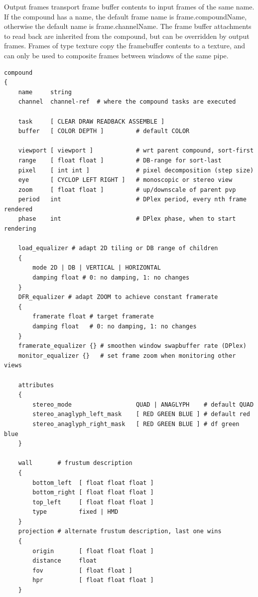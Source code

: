 \documentclass[10pt,a4]{scrartcl}
\begin{document}
Output frames transport frame buffer contents to input frames of the
same name. If the compound has a name, the default frame name is
\textsf{frame.compoundName}, otherwise the default name is
\textsf{frame.channelName}. The frame buffer attachments to read back
are inherited from the compound, but can be overridden by output
frames. Frames of type \textsf{texture} copy the framebuffer contents to
a texture, and can only be used to composite frames between windows of
the same pipe.

{\footnotesize\begin{lstlisting}
compound
{
    name     string
    channel  channel-ref  # where the compound tasks are executed

    task     [ CLEAR DRAW READBACK ASSEMBLE ]
    buffer   [ COLOR DEPTH ]         # default COLOR

    viewport [ viewport ]            # wrt parent compound, sort-first
    range    [ float float ]         # DB-range for sort-last
    pixel    [ int int ]             # pixel decomposition (step size)
    eye      [ CYCLOP LEFT RIGHT ]   # monoscopic or stereo view
    zoom     [ float float ]         # up/downscale of parent pvp
    period   int                     # DPlex period, every nth frame rendered
    phase    int                     # DPlex phase, when to start rendering

    load_equalizer # adapt 2D tiling or DB range of children
    {
        mode 2D | DB | VERTICAL | HORIZONTAL
        damping float # 0: no damping, 1: no changes
    }
    DFR_equalizer # adapt ZOOM to achieve constant framerate
    {
        framerate float # target framerate
        damping float   # 0: no damping, 1: no changes
    }
    framerate_equalizer {} # smoothen window swapbuffer rate (DPlex)
    monitor_equalizer {}   # set frame zoom when monitoring other views

    attributes
    {
        stereo_mode                  QUAD | ANAGLYPH    # default QUAD
        stereo_anaglyph_left_mask    [ RED GREEN BLUE ] # default red
        stereo_anaglyph_right_mask   [ RED GREEN BLUE ] # df green blue
    }

    wall       # frustum description
    {
        bottom_left  [ float float float ]
        bottom_right [ float float float ]
        top_left     [ float float float ]
        type         fixed | HMD
    }
    projection # alternate frustum description, last one wins
    {
        origin       [ float float float ]
        distance     float
        fov          [ float float ]
        hpr          [ float float float ]
    }
    

\end{lstlisting}}
\end{document}
